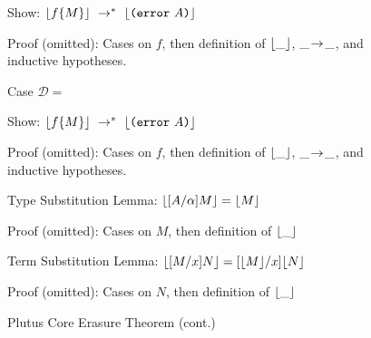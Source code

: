 \documentclass[../main.tex]{subfiles}
\begin{document}
\begin{figure*}
    Show: \(\multistep{\erase{\ctxsubst{f}{M}}}{\erase{\error{A}}}\)
    
    Proof (omitted): Cases on $f$, then definition of $\erase{\_}$, $\step{\_\!\!\!}{\!\!\!\_}$, and inductive hypotheses.
    
    
    
    Case \(\mathcal{D} =\)
    
    \begin{prooftree}
    \end{prooftree}
    
    Show: \(\multistep{\erase{\ctxsubst{f}{M}}}{\erase{\error{A}}}\)
    
    Proof (omitted): Cases on $f$, then definition of $\erase{\_}$, $\step{\_\!\!\!}{\!\!\!\_}$, and inductive hypotheses.
    
    \vspace{2em}
    
    Type Substitution Lemma: \(\erase{\subst{A}{\alpha}{M}} = \erase{M}\)
    
    Proof (omitted): Cases on $M$, then definition of $\erase{\_}$
    
    \vspace{2em}
    
    Term Substitution Lemma: \(\erase{\subst{M}{x}{N}} = \subst{\erase{M}}{x}{\erase{N}}\)
    
    Proof (omitted): Cases on $N$, then definition of $\erase{\_}$
    
    
    \caption{Plutus Core Erasure Theorem (cont.)}
    \label{fig:Plutus_core_erasure_theorem_cont}
\end{figure*}
\end{document}
